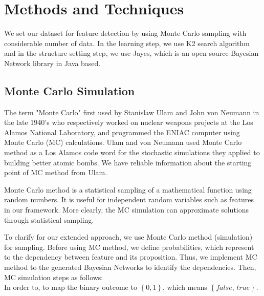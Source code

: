 \documentclass[a4,12pt]{ozu-thesis}
\begin{document}
\section{Methods and Techniques}
We set our dataset for feature detection by using Monte Carlo sampling with considerable number of data. In the learning step, we use K2 search algorithm and in the structure setting step, we use Jayes, which is an open source Bayesian Network library in Java based.

\subsection{Monte Carlo Simulation}
The term "Monte Carlo" first used by Stanislaw Ulam and John von Neumann in the late 1940's who respectively worked on nuclear weapons projects at the Los Alamos National Laboratory, and programmed the ENIAC computer using Monte Carlo (MC) calculations. Ulam and von Neumann used Monte Carlo method as a Los Alamos code word for the stochastic simulations they applied to building better atomic bombs. We have reliable information about the starting point of MC method from Ulam. 


Monte Carlo method is a statistical sampling of a mathematical function using random numbers. It is useful for independent random variables such as features in our framework. More clearly, the MC simulation can approximate solutions through statistical sampling.
 
 
 To clarify for our extended approach, we use Monte Carlo method (simulation) for sampling. Before using MC method, we define probabilities, which represent to the dependency between feature and its proposition. Thus, we implement MC method to the generated Bayesian Networks to identify the dependencies. Then, MC simulation steps as follows:
 \\In order to, to map the binary outcome to $\left \{\mathit{ 0, 1} \right \}$, which means $\left \{\textit{false, true}  \right \}$.

\makeatletter
\def\BState{\State\hskip-\ALG@thistlm}
\makeatother
\end{document}
